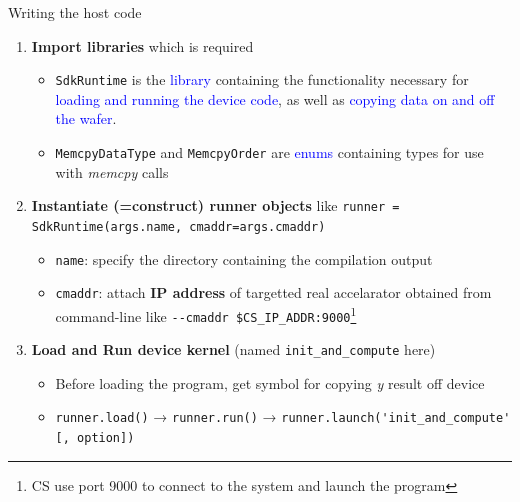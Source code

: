 \documentclass[dvipdfmx, 11pt, aspectratio=169]{beamer}   %
\begin{document}
\begin{frame}[fragile]{Writing the host code}
\begin{enumerate}
    \item \textbf{Import libraries} which is required
    \begin{itemize}
        \item \lstinline|SdkRuntime| is the \textcolor{blue}{library} containing the functionality necessary for \textcolor{blue}{loading and running the device code}, as well as \textcolor{blue}{copying data on and off the wafer}.
        \item \lstinline|MemcpyDataType| and \lstinline|MemcpyOrder| are \textcolor{blue}{enums} containing types for use with \textit{memcpy} calls
    \end{itemize}
    \item \textbf{Instantiate (=construct) runner objects} like \lstinline|runner = SdkRuntime(args.name, cmaddr=args.cmaddr)| %
    \begin{itemize}
        \item \lstinline|name|: specify the directory containing the compilation output
        \item \lstinline|cmaddr|: attach \textbf{IP address} of targetted real accelarator obtained from command-line like \lstinline|--cmaddr $CS_IP_ADDR:9000|\footnote{CS use port 9000 to connect to the system and launch the program}
    \end{itemize}
    \item \textbf{Load and Run device kernel} (named \lstinline|init_and_compute| here)
    \begin{itemize}
        \item Before loading the program, get symbol for copying \textit{y} result off device
        \item \lstinline|runner.load()| → \lstinline|runner.run()| → \lstinline|runner.launch('init_and_compute' [, option])|
    \end{itemize}
\end{enumerate}
\end{frame}
\end{document}
